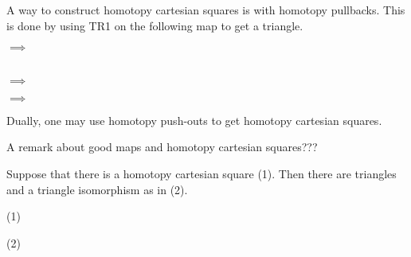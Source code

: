     \begin{remark}
        A way to construct homotopy cartesian squares is with homotopy pullbacks. This is done by using TR1 on the following map to get a triangle.
        \begin{center}
            $\implies$
             \\
            $\implies$
            $\implies$
        \end{center}

        Dually, one may use homotopy push-outs to get homotopy cartesian squares.
    \end{remark}

    \begin{remark}
        A remark about good maps and homotopy cartesian squares???
    \end{remark}

    \begin{lemma}
        Suppose that there is a homotopy cartesian square (1). Then there are triangles and a triangle isomorphism as in (2).
        \begin{center}
            (1)
            (2)
        \end{center}
    \end{lemma}

